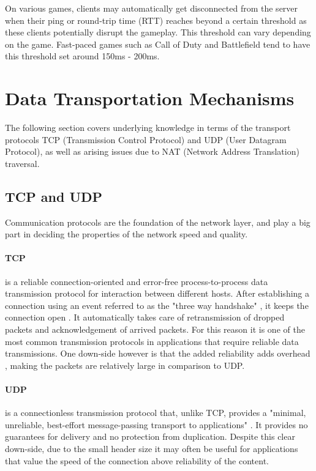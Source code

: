 \documentclass[bsc, 12pt, twoside, singlespacing, parskip, abbrevs, notimes, normalheadings, logo]{styles/infthesis}
\begin{document}
On various games, clients may automatically get disconnected from the server when their ping or round-trip time (RTT) reaches beyond a certain threshold as these clients potentially disrupt the gameplay. This threshold can vary depending on the game. Fast-paced games such as Call of Duty and Battlefield tend to have this threshold set around 150ms - 200ms.

\section{Data Transportation Mechanisms}
The following section covers underlying knowledge in terms of the transport protocols TCP (Transmission Control Protocol) and UDP (User Datagram Protocol), as well as arising issues due to NAT (Network Address Translation) traversal.

\subsection{TCP and UDP}
Communication protocols are the foundation of the network layer, and play a big part in deciding the properties of the network speed and quality.

\paragraph*{TCP} is a reliable connection-oriented and error-free process-to-process data transmission protocol for interaction between different hosts. After establishing a connection using an event referred to as the "three way handshake" \cite{handshake}, it keeps the connection open \cite{tcp_open_connection}. It automatically takes care of retransmission of dropped packets and acknowledgement of arrived packets. For this reason it is one of the most common transmission protocols in applications that require reliable data transmissions. One down-side however is that the added reliability adds overhead \cite{Multiplayer_Networking_modern_engine}, making the packets are relatively large in comparison to UDP.

\paragraph*{UDP} is a connectionless transmission protocol that, unlike TCP, provides a "minimal, unreliable, best-effort message-passing transport to applications" \cite{udp_connectionless}. It provides no guarantees for delivery and no protection from duplication. Despite this clear down-side, due to the small header size it may often be useful for applications that value the speed of the connection above reliability of the content.
\end{document}
